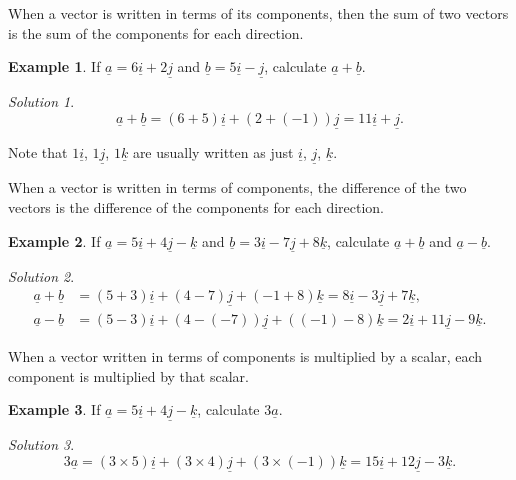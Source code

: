 \documentclass[
  11pt,
  oneside]{book}
\newcommand{\slide}{}
\theoremstyle{definition}
\theoremstyle{definition}
\newtheorem{example}{Example}[chapter]
\theoremstyle{definition}
\theoremstyle{definition}
\theoremstyle{remark}
\newtheorem*{solution}{Solution}
\begin{document}
When a vector is written in terms of its components, then the sum of two vectors is the sum of the components for each direction.

\begin{example}
If \(\underline a = 6\underline i + 2\underline j\) and \(\underline b = 5\underline i - \underline j\), calculate \(\underline{a}+\underline{b}\).
\end{example}

\begin{solution}
\[
\underline a + \underline b = (6 + 5)\underline i + (2 + (-1))\underline j = 11\underline i + \underline j.
\]
\end{solution}

Note that \(1\underline i\), \(1\underline j\), \(1\underline k\) are usually written as just \(\underline i\), \(\underline j\), \(\underline k\).

\slide

When a vector is written in terms of components, the difference of the two vectors is the difference of the components for each direction.

\begin{example}
If \(\underline a = 5\underline i + 4\underline j - \underline k\) and \(\underline b = 3\underline i - 7\underline j + 8\underline k\), calculate \(\underline{a}+\underline{b}\) and \(\underline{a}-\underline{b}\).
\end{example}

\begin{solution}
\begin{align*}
\underline a + \underline b &= (5+3)\underline i + (4 - 7)\underline j + (-1 + 8)\underline k = 8\underline i -3\underline j + 7\underline k,\\
\underline a - \underline b &= (5 - 3)\underline i + (4 - (-7))\underline j + ((-1) - 8)\underline k = 2\underline i + 11\underline j -9\underline k.
\end{align*}
\end{solution}

\slide

When a vector written in terms of components is multiplied by a scalar, each component is multiplied by that scalar.

\begin{example}
If \(\underline a = 5\underline i + 4\underline j - \underline k\), calculate \(3\underline{a}\).
\end{example}

\begin{solution}
\[
3\underline a = (3\times 5)\underline{i} + (3\times 4)\underline{j} + (3\times(-1))\underline{k} = 15\underline i + 12\underline j - 3\underline k.
\]
\end{solution}
\end{document}

